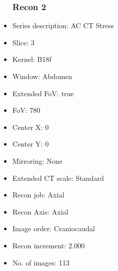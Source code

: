 \documentclass[12pt]{article}
\begin{document}
\begin{itemize}
\subsubsection{Recon 2}
\item Series description: AC CT Stress
\item Slice: 3
\item Kernel: B18f
\item Window: Abdomen
\item Extended FoV: true
\item FoV: 780
\item Center X: 0
\item Center Y: 0
\item Mirroring: None
\item Extended CT scale: Standard
\item Recon job: Axial
\item Recon Axis: Axial
\item Image order: Craniocaudal
\item Recon increment: 2.000
\item No. of images: 113
\end{itemize}
\end{document}
